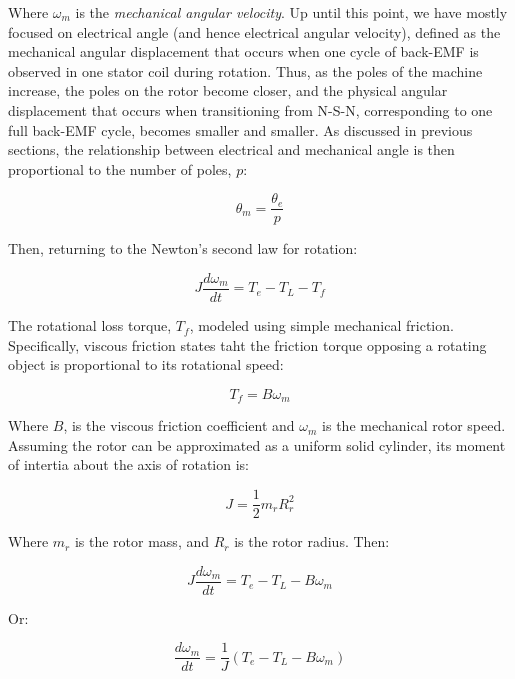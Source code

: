 \documentclass{article}
\begin{document}
Where $\omega_m$ is the \textit{mechanical angular velocity}. Up until this point, we have mostly focused on electrical angle (and hence electrical angular velocity), defined as the mechanical angular displacement that occurs when one cycle of back-EMF is observed in one stator coil during rotation. Thus, as the poles of the machine increase, the poles on the rotor become closer, and the physical angular displacement that occurs when transitioning from N-S-N, corresponding to one full back-EMF cycle, becomes smaller and smaller. As discussed in previous sections, the relationship between electrical and mechanical angle is then proportional to the number of poles, $p$:

\begin{equation}
    \theta_m = \frac{\theta_e}{p}
\end{equation}

Then, returning to the Newton's second law for rotation:

\begin{equation}
    J\frac{d\omega_m}{dt} = T_e - T_L - T_f
\end{equation}

The rotational loss torque, $T_f$, modeled using simple mechanical friction. Specifically, viscous friction states taht the friction torque opposing a rotating object is proportional to its rotational speed:

\begin{equation}
    T_f = B\omega_m
\end{equation}

Where $B$, is the viscous friction coefficient and $\omega_m$ is the mechanical rotor speed. Assuming the rotor can be approximated as a uniform solid cylinder, its moment of intertia about the axis of rotation is:

\begin{equation}
    J = \frac{1}{2}m_rR_r^2
\end{equation}

Where $m_r$ is the rotor mass, and $R_r$ is the rotor radius. Then:

\begin{equation}
    J\frac{d\omega_m}{dt} = T_e - T_L - B\omega_m
\end{equation}

Or:

\begin{equation}
    \frac{d\omega_m}{dt} = \frac{1}{J}(T_e - T_L - B\omega_m)
\end{equation}
\end{document}
